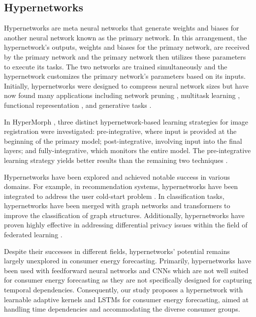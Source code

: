 \subsection{Hypernetworks}

Hypernetworks are meta neural networks that generate weights and biases for another neural network known as the primary network. In this arrangement, the hypernetwork's outputs, weights and biases for the primary network, are received by the primary network \cite{hoopes2021hypermorph} and the primary network then utilizes these parameters to execute its tasks. The two networks are trained simultaneously and the hypernetwork customizes the primary network's parameters based on its inputs. Initially, hypernetworks were designed to compress neural network sizes \cite{schmidhuber1993self} but have now found many applications including network pruning \cite{li2020dhp}, multitask learning \cite{meyerson2019modular}, functional representation \cite{klocek2019hypernetwork}, and generative tasks \cite{ratzlaff2019hypergan}.

In HyperMorph \cite{hoopes2021hypermorph}, three distinct hypernetwork-based learning strategies for image registration were investigated: pre-integrative, where input is provided at the beginning of the primary model; post-integrative, involving input into the final layers; and fully-integrative, which monitors the entire model. The pre-integrative learning strategy yields better results than the remaining two techniques \cite{hoopes2021hypermorph}.

Hypernetworks have been explored and achieved notable success in various domains. For example, in recommendation systems, hypernetworks have been integrated to address the user cold-start problem \cite{lu2023hyperrs}. In classification tasks, hypernetworks have been merged with graph networks and transformers to improve the classification of graph structures. Additionally, hypernetworks have proven highly effective in addressing differential privacy issues within the field of federated learning \cite{nemala2023differential}.

Despite their successes in different fields, hypernetworks' potential remains largely unexplored in {consumer energy} forecasting. Primarily, hypernetworks have been used with feedforward neural networks and CNNs \cite{hoopes2021hypermorph} which are not well suited for {consumer energy} forecasting as they are not specifically designed for capturing temporal dependencies. Consequently, our study proposes a hypernetwork with learnable adaptive kernels and LSTMs for {consumer energy} forecasting, aimed at handling time dependencies and accommodating the diverse consumer groups.


\vspace{-5pt}